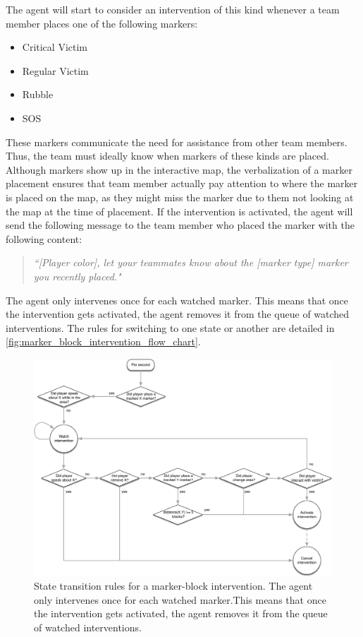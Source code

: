 The agent will start to consider an intervention of this kind whenever a team
member places one of the following markers:

\begin{itemize}
	\item Critical Victim
	\item Regular Victim
	\item Rubble
	\item SOS
\end{itemize}

These markers communicate the need for assistance from other team members.
Thus, the team must ideally know when markers of these kinds are placed.
Although markers show up in the interactive map, the verbalization of a marker
placement ensures that team member actually pay attention to where the marker
is placed on the map, as they might miss the marker due to them not looking at
the map at the time of placement.  If the intervention is activated, the agent
will send the following message to the team member who placed the marker with the following
content:

\begin{quote} 
    \emph{``[Player color], let your teammates know about the [marker type]
    marker you recently placed."}
\end{quote}

The agent only intervenes once for each watched marker. This means that once
the intervention gets activated, the agent removes it from the queue of watched
interventions. The rules for switching to one state or another are detailed in
\autoref{fig:marker_block_intervention_flow_chart}.

%
\begin{figure}
    \centering
    \includegraphics[width=\textwidth]{images/marker_block_intervention_flow_chart.pdf}
    \caption{%
        State transition rules for a marker-block intervention. The agent only
        intervenes once for each watched marker.This means that once the
        intervention gets activated, the agent removes it from the queue of
        watched interventions.
    }
    \label{fig:marker_block_intervention_flow_chart}
\end{figure}
%

